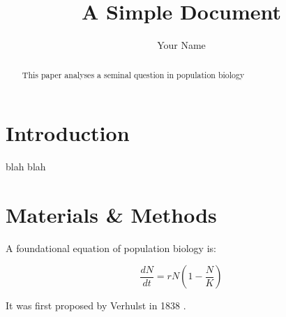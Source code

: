 \documentclass[12pt]{article}
\title{A Simple Document}
\author{Your Name}
\date{}
\begin{document}
    \maketitle

    \begin{abstract}
        This paper analyses a seminal question in population biology
    \end{abstract}

    \section{Introduction}
        blah blah
    
    \section{Materials \& Methods}
        A foundational equation of population biology is:

        \begin{equation}
            \frac{dN}{dt} = r N (1 - \frac{N}{K})
        \end{equation}
        
        It was first proposed by Verhulst in 1838 \cite{verhulst1838notice}.

        

        
        
\end{document}

